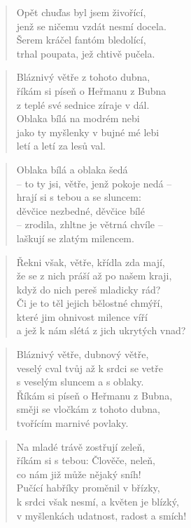 \documentclass{book}
\begin{document}
\begin{verse}
Opět chuďas byl jsem živořící,\\
jenž se ničemu vzdát nesmí docela.\\
Šerem kráčel fantóm bledolící,\\
trhal poupata, jež chtivě pučela.
\end{verse}
\newpage
{}
\begin{verse}
Bláznivý větře z tohoto dubna,\\
říkám si píseň o Heřmanu z Bubna\\
z teplé své sednice zíraje v dál.\\
Oblaka bílá na modrém nebi\\
jako ty myšlenky v bujné mé lebi\\
letí a letí za lesů val.
\end{verse}
\begin{verse}
Oblaka bílá a oblaka šedá\\
-- to ty jsi, větře, jenž pokoje nedá --\\
hrají si s tebou a se sluncem:\\
děvčice nezbedné, děvčice bílé\\
-- zrodila, zhltne je větrná chvíle --\\
laškují se zlatým milencem.
\end{verse}
\begin{verse}
Řekni však, větře, křídla zda mají,\\
že se z nich práší až po našem kraji,\\
když do nich pereš mladicky rád?\\
Či je to těl jejich bělostné chmýří,\\
které jim ohnivost milence víří\\
a jež k nám slétá z jich ukrytých vnad?
\end{verse}
\begin{verse}
Bláznivý větře, dubnový větře,\\
veselý cval tvůj až k srdci se vetře\\
s veselým sluncem a s oblaky.\\
Říkám si píseň o Heřmanu z Bubna,\\
směji se vločkám z tohoto dubna,\\
tvořícím marnivé povlaky.
\end{verse}
\begin{verse}
Na mladé trávě zostřují zeleň,\\
říkám si s tebou: Člověče, neleň,\\
co nám již může nějaký sníh!\\
Pučící habříky proměnil v břízky,\\
k srdci však nesmí, a květen je blízký,\\
v myšlenkách udatnost, radost a smích!
\end{verse}
\end{document}
